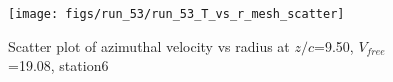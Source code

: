 \begin{figure}[H]
\centering
\texttt{[image: figs/run\_53/run\_53\_T\_vs\_r\_mesh\_scatter]}
\caption{Scatter plot of azimuthal velocity vs radius at $z/c$=9.50, $V_{free}$=19.08, station6}
\label{fig:run_53_T_vs_r_mesh_scatter}
\end{figure}



